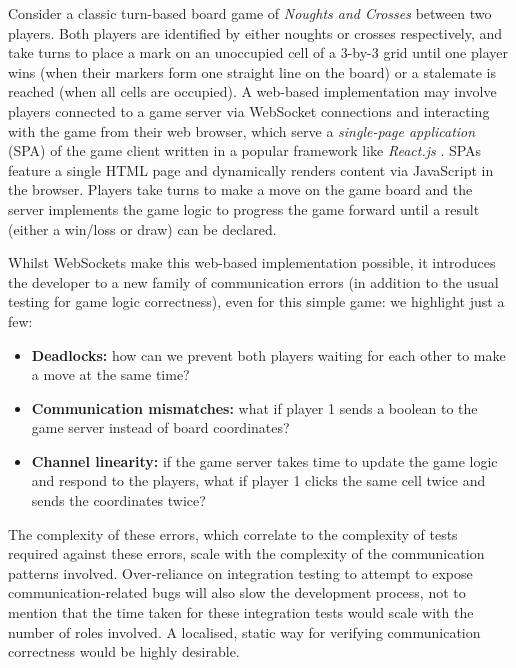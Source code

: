 Consider a classic turn-based board game of \textit{Noughts and Crosses} 
between two players. Both players are identified by either noughts or crosses 
respectively, and take turns to place a mark on an unoccupied cell 
of a 3-by-3 grid until one player wins (when their markers form 
one straight line on the board) or a stalemate is reached 
(when all cells are occupied). A web-based implementation may 
involve players connected to a game server via WebSocket connections 
and interacting with the game from their web browser, which serve 
a \textit{single-page application} (SPA) of the game client written 
in a popular framework like \textit{React.js} \cite{React}. 
SPAs feature a single HTML page and dynamically renders content 
via JavaScript in the browser. 
Players take turns to make a move on the game board and the server 
implements the game logic to progress the game forward until 
a result (either a win/loss or draw) can be declared. 

Whilst WebSockets make this web-based implementation possible, 
it introduces the developer to a new family of communication errors
(in addition to the usual testing for game logic correctness), 
even for this simple game:
we highlight just a few:

\begin{itemize}

\item
\textbf{Deadlocks:} how can we prevent both players waiting for 
each other to make a move at the same time?

\item 
\textbf{Communication mismatches:} what if player 1 sends
a boolean to the game server instead of board coordinates?

\item
\textbf{Channel linearity:} if the game server takes time
to update the game logic and respond to the players, what if 
player 1 clicks the same cell twice and sends the coordinates twice?

\end{itemize}

The complexity of these errors, which correlate to the complexity of tests 
required against these errors, scale with the complexity of the 
communication patterns involved. Over-reliance on integration testing
to attempt to expose communication-related bugs will also slow the
development process, not to mention that the time taken for these
integration tests would scale with the number of roles involved.
A localised, static way for verifying communication correctness would
be highly desirable.

